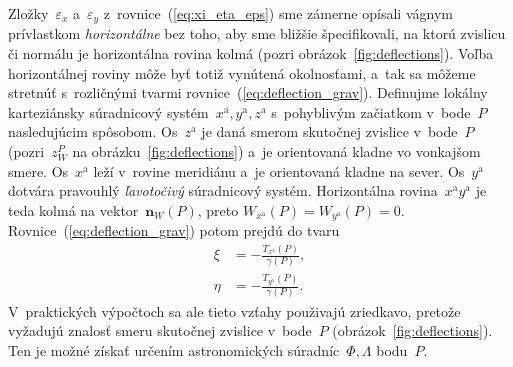 \documentclass[a4paper, 12pt]{book}
\let\vec\mathbf
\begin{document}
Zložky~$\varepsilon_x$ a~$\varepsilon_y$ z~rovnice~(\ref{eq:xi_eta_eps}) sme 
zámerne opísali vágnym prívlastkom \emph{horizontálne} bez toho, aby sme 
bližšie špecifikovali, na ktorú zvislicu či normálu je horizontálna rovina 
kolmá (pozri obrázok~\ref{fig:deflections}).  Voľba horizontálnej roviny môže 
byť totiž vynútená okolnosťami, a~tak sa môžeme stretnúť s~rozličnými tvarmi 
rovnice~(\ref{eq:deflection_grav}).  Definujme lokálny karteziánsky súradnicový 
systém~$x^\mathrm{a}, y^\mathrm{a}, z^\mathrm{a}$ s~pohyblivým začiatkom 
v~bode~$P$ nasledujúcim spôsobom.  Os~$z^\mathrm{a}$ je daná smerom skutočnej 
zvislice v~bode~$P$ (pozri~$z_W^P$ na obrázku~\ref{fig:deflections}) a~je 
orientovaná kladne vo vonkajšom smere.  Os~$x^\mathrm{a}$ leží v~rovine 
meridiánu a~je orientovaná kladne na sever.  Os~$y^\mathrm{a}$ dotvára 
pravouhlý \emph{ľavotočivý} súradnicový systém.  Horizontálna 
rovina~$x^\mathrm{a}y^\mathrm{a}$ je teda kolmá na vektor~$\vec n_W(P)$, preto 
$W_{x^\mathrm{a}}(P) = W_{y^\mathrm{a}}(P) = 0$.  
Rovnice~(\ref{eq:deflection_grav}) potom prejdú do tvaru 
\parencite{Borre_chapter4}
%
\begin{equation}
\label{eq:deflection_grav_nat}
\begin{split}
\xi &= -\frac{T_{x^\mathrm{a}}(P)}{\gamma(P)}{,}\\
%
\eta &= -\frac{T_{y^\mathrm{a}}(P)}{\gamma(P)}{.}
\end{split}
\end{equation}
%
V~praktických výpočtoch sa ale tieto vzťahy použivajú zriedkavo, pretože 
vyžadujú znalosť smeru skutočnej zvislice v~bode~$P$ 
(obrázok~\ref{fig:deflections}).  Ten je možné získať určením astronomických 
súradníc~$\Phi, \Lambda$ bodu~$P$.
\end{document}
